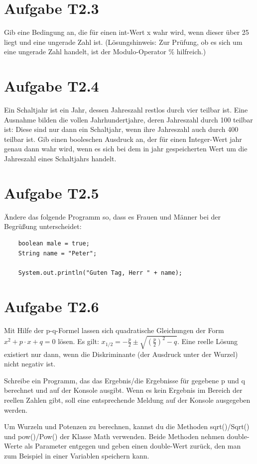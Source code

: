 \documentclass[final,a4paper]{article}
\begin{document}
\section*{Aufgabe T2.3}
Gib eine Bedingung an, die für einen int-Wert x wahr wird, wenn dieser über 25 liegt und eine ungerade Zahl ist. (Lösungshinweis:  Zur Prüfung, ob es sich um eine ungerade Zahl handelt, ist der Modulo-Operator \% hilfreich.)


\section*{Aufgabe T2.4}
Ein Schaltjahr ist ein Jahr, dessen Jahreszahl restlos durch vier teilbar ist. Eine Ausnahme bilden die vollen Jahrhundertjahre, deren Jahreszahl durch 100 teilbar ist: Diese sind nur dann ein Schaltjahr, wenn ihre Jahreszahl auch durch 400 teilbar ist.
Gib einen booleschen Ausdruck an, der für einen Integer-Wert jahr genau dann wahr wird, wenn es sich bei dem in jahr gespeicherten Wert um die Jahreszahl eines Schaltjahrs handelt.

\section*{Aufgabe T2.5}
Ändere das folgende Programm so, dass es Frauen und Männer bei der Begrüßung unterscheidet:
\begin{lstlisting}
	boolean male = true;
	String name = "Peter";
	
	System.out.println("Guten Tag, Herr " + name);
\end{lstlisting}

\section*{Aufgabe T2.6}
Mit Hilfe der p-q-Formel lassen sich quadratische Gleichungen der Form \(x^2 + p \cdot x + q = 0\) lösen. Es gilt: \(x_{1/2} = - \frac{p}{2} \pm \sqrt{\left( \frac{p}{2}\right)^2 -q}\). Eine reelle Lösung existiert nur dann, wenn die Diskriminante (der Ausdruck unter der Wurzel) nicht negativ ist. 

Schreibe ein Programm, das das Ergebnis/die Ergebnisse für gegebene p und q berechnet und auf der Konsole ausgibt. Wenn es kein Ergebnis im Bereich der reellen Zahlen gibt, soll eine entsprechende Meldung auf der Konsole ausgegeben werden. 

Um Wurzeln und Potenzen zu berechnen, kannst du die Methoden sqrt()/Sqrt() und pow()/Pow() der Klasse Math verwenden. Beide Methoden nehmen double-Werte als Parameter entgegen und geben einen double-Wert zurück, den man zum Beispiel in einer Variablen speichern kann.
\end{document}
